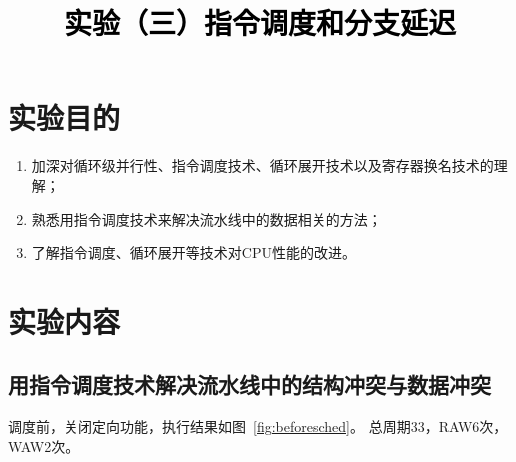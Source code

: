 \documentclass[a4paper,twoside]{article}
\newcommand{\PaperTitle}{实验（三）指令调度和分支延迟}  %
\begin{document}
\newpage

\title{
	\Large{\textcolor{black}{\PaperTitle}}
}
	
	
\maketitle
	
\tableofcontents
 
\newpage
\setcounter{page}{1}

\begin{spacing}{1.2}

\section{实验目的}

\begin{enumerate}
	\item 加深对循环级并行性、指令调度技术、循环展开技术以及寄存器换名技术的理解；
	\item 熟悉用指令调度技术来解决流水线中的数据相关的方法；
	\item 了解指令调度、循环展开等技术对CPU性能的改进。
\end{enumerate}

\section{实验内容}

\subsection{用指令调度技术解决流水线中的结构冲突与数据冲突}

调度前，关闭定向功能，执行结果如图~\ref{fig:beforesched}。
总周期33，RAW6次，WAW2次。


\end{spacing}
\end{document}
